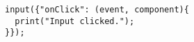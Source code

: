 
\begin{verbatim}
input({"onClick": (event, component){
  print("Input clicked.");
}});
\end{verbatim}
